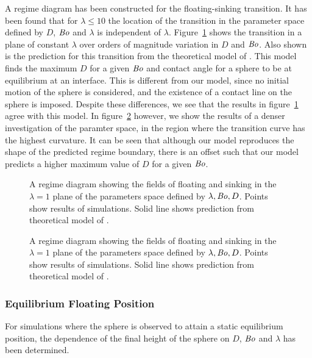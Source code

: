 \documentclass[12pt]{article}
\newcommand\Bo{\mbox{\textit{Bo}}}  %
\begin{document}
A regime diagram has been constructed for the floating-sinking transition. It has been found that for $\lambda \leq 10$ the location of the transition in the parameter space defined by $D$, $\Bo$ and $\lambda$ is independent of $\lambda$. Figure~\ref{fig:regime} shows the transition in a plane of constant $\lambda$ over orders of magnitude variation in $D$ and $\Bo$. Also shown is the prediction for this transition from the theoretical model of \citep{Vella06}. This model finds the maximum $D$ for a given $\Bo$ and contact angle for a sphere to be at equilibrium at an interface. This is different from our model, since no initial motion of the sphere is considered, and the existence of a contact line on the sphere is imposed. Despite these differences, we see that the results in figure~\ref{fig:regime} agree with this model. In figure~\ref{fig:zoom_regime} however, we show the results of a denser investigation of the paramter space, in the region where the transition curve has the highest curvature. It can be seen that although our model reproduces the shape of the predicted regime boundary, there is an offset such that our model predicts a higher maximum value of $D$ for a given $\Bo$.

  \begin{figure}
    \resizebox{0.9\textwidth}{!}{\large }
    \caption{A regime diagram showing the fields of floating and sinking in the $\lambda = 1$ plane of the parameters space defined by ${\lambda, \Bo, D}$. Points show results of simulations. Solid line shows prediction from theoretical model of \citep{Vella06}.\label{fig:regime}}
  \end{figure}

  \begin{figure}
    \resizebox{0.9\textwidth}{!}{\large }
    \caption{A regime diagram showing the fields of floating and sinking in the $\lambda = 1$ plane of the parameters space defined by ${\lambda, \Bo, D}$. Points show results of simulations. Solid line shows prediction from theoretical model of \citep{Vella06}.\label{fig:zoom_regime}}
  \end{figure}

\subsubsection{Equilibrium Floating Position}
\label{subsubsec:equilib_pos}

For simulations where the sphere is observed to attain a static equilibrium position, the dependence of the final height of the sphere on $D$, $\Bo$ and $\lambda$ has been determined. 
\end{document}
